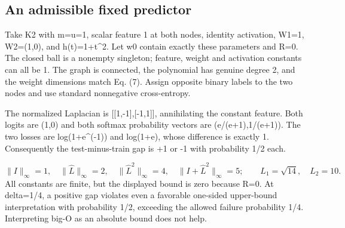 \documentclass[10pt]{article}
\begin{document}
\subsection*{An admissible fixed predictor}
Take K2 with m=u=1, scalar feature 1 at both nodes, identity activation, W1=1, W2=(1,0), and h(t)=1+t\textasciicircum{}2. Let w0 contain exactly these parameters and R=0. The closed ball is a nonempty singleton; feature, weight and activation constants can all be 1. The graph is connected, the polynomial has genuine degree 2, and the weight dimensions match Eq. (7). Assign opposite binary labels to the two nodes and use standard nonnegative cross-entropy.\par
The normalized Laplacian is [[1,-1],[-1,1]], annihilating the constant feature. Both logits are (1,0) and both softmax probability vectors are (e/(e+1),1/(e+1)). The two losses are log(1+e\textasciicircum{}(-1)) and log(1+e), whose difference is exactly 1. Consequently the test-minus-train gap is +1 or -1 with probability 1/2 each.\par
\[\|I\|_\infty=1,\quad\|\widehat L\|_\infty=2,\quad\|\widehat L^2\|_\infty=4,\quad\|I+\widehat L^2\|_\infty=5;\qquad L_1=\sqrt{14},\quad L_2=10.\] All constants are finite, but the displayed bound is zero because R=0. At delta=1/4, a positive gap violates even a favorable one-sided upper-bound interpretation with probability 1/2, exceeding the allowed failure probability 1/4. Interpreting big-O as an absolute bound does not help.\par
\end{document}
